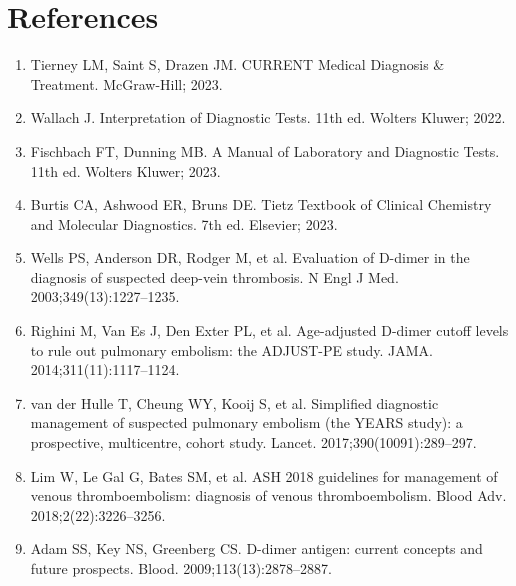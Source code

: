 \section*{References}
\begin{enumerate}
  \item Tierney LM, Saint S, Drazen JM. CURRENT Medical Diagnosis \& Treatment. McGraw-Hill; 2023.
  \item Wallach J. Interpretation of Diagnostic Tests. 11th ed. Wolters Kluwer; 2022.
  \item Fischbach FT, Dunning MB. A Manual of Laboratory and Diagnostic Tests. 11th ed. Wolters Kluwer; 2023.
  \item Burtis CA, Ashwood ER, Bruns DE. Tietz Textbook of Clinical Chemistry and Molecular Diagnostics. 7th ed. Elsevier; 2023.
  \item Wells PS, Anderson DR, Rodger M, et al. Evaluation of D-dimer in the diagnosis of suspected deep-vein thrombosis. N Engl J Med. 2003;349(13):1227--1235.
  \item Righini M, Van Es J, Den Exter PL, et al. Age-adjusted D-dimer cutoff levels to rule out pulmonary embolism: the ADJUST-PE study. JAMA. 2014;311(11):1117--1124.
  \item van der Hulle T, Cheung WY, Kooij S, et al. Simplified diagnostic management of suspected pulmonary embolism (the YEARS study): a prospective, multicentre, cohort study. Lancet. 2017;390(10091):289--297.
  \item Lim W, Le Gal G, Bates SM, et al. ASH 2018 guidelines for management of venous thromboembolism: diagnosis of venous thromboembolism. Blood Adv. 2018;2(22):3226--3256.
  \item Adam SS, Key NS, Greenberg CS. D-dimer antigen: current concepts and future prospects. Blood. 2009;113(13):2878--2887.
\end{enumerate}

\clearpage
